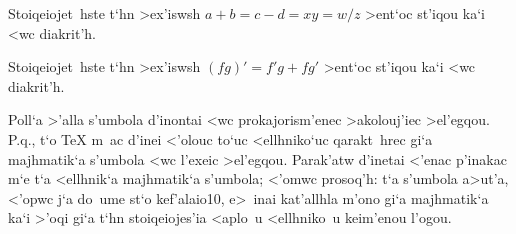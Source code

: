 \exercise Stoiqeiojet~hste t`hn >ex'iswsh $a+b=c-d=xy=w/z$ >ent`oc
st'iqou ka`i <wc diakrit'h.

\exercise Stoiqeiojet~hste t`hn >ex'iswsh $(fg)' = f'g + fg'$ >ent`oc
st'iqou ka`i <wc diakrit'h.                 
\bigskip

Poll`a >'alla s'umbola d'inontai <wc prokajorism'enec >akolouj'iec
>el'egqou.  P.q., t`o {\rm \TeX} m~ac d'inei <'olouc to`uc <ellhniko`uc
qarakt~hrec gi`a majhmatik`a s'umbola <wc l'exeic >el'egqou. 
Para\-k'a\-tw d'inetai <'enac p'inakac m`e t`a <ellhnik`a majhmatik`a
s'umbola; <'omwc prosoq'h: t`a s'umbola a>ut'a, <'opwc j`a do~ume st`o
kef'alaio\NB{}10, e>~inai kat'allhla m'ono gi`a majhmatik`a ka`i >'oqi
gi`a t`hn stoiqeiojes'ia <aplo~u <ellhniko~u keim'enou l'ogou.%

